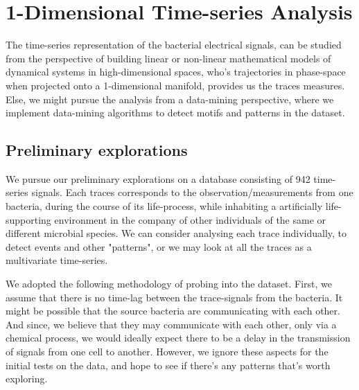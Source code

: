 \documentclass[10pt]{article}
\begin{document}
\pagebreak

\section{1-Dimensional Time-series Analysis}

The time-series representation of the bacterial electrical signals, can be studied from the perspective of building linear or non-linear mathematical models of dynamical systems in high-dimensional spaces, who's trajectories in phase-space when projected onto a 1-dimensional manifold, provides us the traces measures. Else, we might pursue the analysis from a data-mining perspective, where we implement data-mining algorithms to detect motifs and patterns in the dataset. 

\subsection{Preliminary explorations}
We pursue our preliminary explorations on a database consisting of 942 time-series signals. Each traces corresponds to the observation/measurements from one bacteria, during the course of its life-process, while inhabiting a artificially life-supporting environment in the company of other individuals of the same or different microbial species.  
We can consider analysing each trace individually, to detect events and other "patterns", or we may look at all the traces as a multivariate time-series. 

We adopted the following methodology of probing into the dataset. First, we assume that there is no time-lag between the trace-signals from the bacteria. It might be possible that the source bacteria are communicating with each other. And since, we believe that they may communicate with each other, only via a chemical process, we would ideally expect there to be a delay in the transmission of signals from one cell to another. However, we ignore these aspects for the initial tests on the data, and hope to see if there's any patterns that's worth exploring. 
\end{document}
